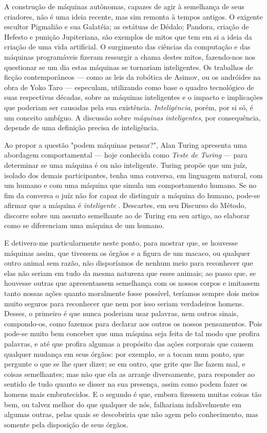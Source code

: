 \documentclass[12pt, a4paper]{article}
\begin{document}
A construção de máquinas autônomas, capazes de agir à semelhança de seus criadores, não é uma ideia recente, mas sim remonta à tempos antigos. 
O exigente escultor Pigmalião e sua Galatéia; as estátuas de Dédalo; Pandora, criação de Hefesto e punição Jupiteriana, 
são exemplos de mitos que tem em si a ideia da criação de uma vida artificial. 
O surgimento das ciências da computação e das máquinas programáveis fizeram ressurgir a chama destes mitos, 
fazendo-nos nos questionar se um dia estas máquinas se tornariam inteligentes.
Os trabalhos de ficção contemporâneos --- como as leis da robótica de Asimov, ou os andróides na obra de Yoko Taro --- especulam, utilizando como base o quadro tecnológico de suas respectivas décadas, sobre as máquinas inteligentes e o impacto e implicações que poderiam ser causadas pela sua existência. 
 \emph{Inteligência}, porém, por si só, é um conceito ambíguo.
A discussão sobre \emph{máquinas inteligentes}, por consequência, depende de uma definição precisa de inteligência.

Ao propor a questão "podem máquinas pensar?", Alan Turing apresenta uma abordagem comportamental --- hoje conhecida como \emph{Teste de Turing} ---
para determinar se uma máquina é ou não inteligente. Turing propõe que um juíz, isolado dos demais participantes,
tenha uma conversa, em linguagem natural, com um humano e com uma máquina que simula um comportamento humano.
Se no fim da conversa o juíz não for capaz de distinguir a máquina do humano, pode-se afirmar que a máquina é \emph{inteligente}
\cite{turing}. Descartes, em seu Discurso do Método, discorre sobre um assunto semelhante ao de Turing em seu artigo, ao elaborar como se diferenciam
uma máquina de um humano.

\begin{displayquote}
E detivera-me particularmente neste ponto, para mostrar que, se houvesse máquinas assim, que tivessem os órgãos e a figura de um macaco,
ou qualquer outro animal sem razão, não disporíamos de nenhum meio para reconhecer que elas não seriam em tudo da mesma natureza que esses animais;
ao passo que, se houvesse outras que apresentassem semelhança com os nossos corpos e imitassem tanto nossas ações quanto moralmente fosse possível,
teríamos sempre dois meios muito seguros para reconhecer que nem por isso seriam verdadeiros homens. Desses, o primeiro é que nunca poderiam usar palavras,
nem outros sinais, compondo-os, como fazemos para declarar aos outros os nossos pensamentos. Pois pode-se muito bem conceber que uma máquina seja feita de tal modo que profira palavras, e até que profira algumas a propósito das ações corporais que causem qualquer mudança em seus órgãos: por exemplo,
se a tocam num ponto, que pergunte o que se lhe quer dizer; se em outro, que grite que lhe fazem mal, e coisas semelhantes;
mas não que ela as arranje diversamente, para responder ao sentido de tudo quanto se disser na sua presença, assim como podem fazer os homens mais embrutecidos. E o segundo é que, embora fizessem muitas coisas tão bem, ou talvez melhor do que qualquer de nós, falhariam infalivelmente em algumas outras,
pelas quais se descobriria que não agem pelo conhecimento, mas somente pela disposição de seus órgãos. \cite{descartes}
\end{displayquote}
\end{document}
